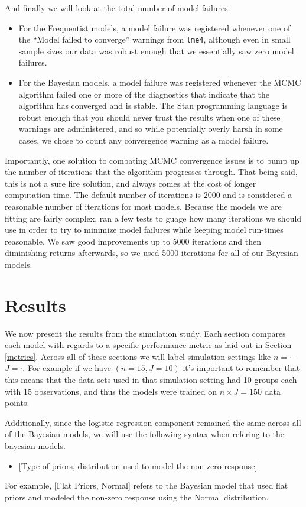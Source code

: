 \documentclass[12pt,twoside]{reedthesis}
\providecommand{\tightlist}{%
  \setlength{\itemsep}{0pt}\setlength{\parskip}{0pt}}
\begin{document}
And finally we will look at the total number of model failures.
\begin{itemize}
\tightlist
\item
  For the Frequentist models, a model failure was registered whenever one of the ``Model failed to converge'' warnings from \texttt{lme4}, although even in small sample sizes our data was robust enough that we essentially saw zero model failures.
\item
  For the Bayesian models, a model failure was registered whenever the MCMC algorithm failed one or more of the diagnostics that indicate that the algorithm has converged and is stable. The Stan programming language is robust enough that you should never trust the results when one of these warnings are administered, and so while potentially overly harsh in some cases, we chose to count any convergence warning as a model failure.
\end{itemize}
Importantly, one solution to combating MCMC convergence issues is to bump up the number of iterations that the algorithm progresses through. That being said, this is not a sure fire solution, and always comes at the cost of longer computation time. The default number of iterations is 2000 and is considered a reasonable number of iterations for most models. Because the models we are fitting are fairly complex, ran a few tests to guage how many iterations we should use in order to try to minimize model failures while keeping model run-times reasonable. We saw good improvements up to 5000 iterations and then diminishing returns afterwards, so we used 5000 iterations for all of our Bayesian models.

\hypertarget{res-sec}{%
\chapter{Results}\label{res-sec}}

We now present the results from the simulation study. Each section compares each model with regards to a specific performance metric as laid out in Section \ref{metrics}. Across all of these sections we will label simulation settings like \(n = \cdot\) - \(J = \cdot\). For example if we have \((n = 15, J = 10 )\) it's important to remember that this means that the data sets used in that simulation setting had 10 groups each with 15 observations, and thus the models were trained on \(n\times J = 150\) data points.

Additionally, since the logistic regression component remained the same across all of the Bayesian models, we will use the following syntax when refering to the bayesian models.
\begin{itemize}
\tightlist
\item
  {[}Type of priors, distribution used to model the non-zero response{]}
\end{itemize}
For example, {[}Flat Priors, Normal{]} refers to the Bayesian model that used flat priors and modeled the non-zero response using the Normal distribution.
\end{document}
